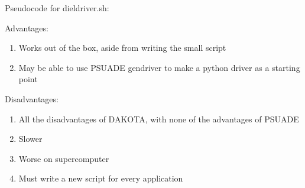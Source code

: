 \documentclass[11pt]{article} %
\begin{document}
Pseudocode for dieldriver.sh:


Advantages:
\begin{enumerate}
	\item Works out of the box, aside from writing the small script
	\item May be able to use PSUADE gendriver to make a python driver as a starting point
\end{enumerate}
Disadvantages:
\begin{enumerate}
	\item All the disadvantages of DAKOTA, with none of the advantages of PSUADE
	\item Slower
	\item Worse on supercomputer
	\item Must write a new script for every application
\end{enumerate}
\end{document}
